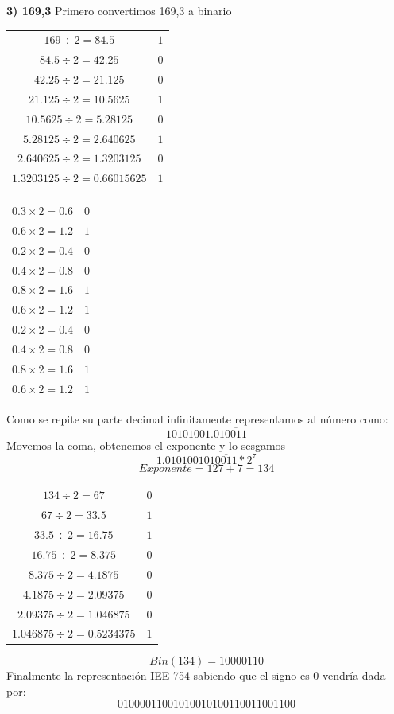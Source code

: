 \documentclass[12pt]{article}
\begin{document}
\large{\textbf{3) 169,3}}
\normalsize
Primero convertimos 169,3 a binario
\begin{center}
    \begin{tabular}{|c|c|}
        \hline
        $169 \div 2 = 84.5$ & $1$\\
        $84.5 \div 2 = 42.25$ & $0$\\
        $42.25 \div 2 = 21.125$ & $0$\\
        $21.125 \div 2 = 10.5625$ & $1$\\
        $10.5625 \div 2 = 5.28125$ & $0$\\
        $5.28125 \div 2 = 2.640625$ & $1$\\
        $2.640625 \div 2 = 1.3203125$ & $0$\\
        $1.3203125 \div 2 = 0.66015625$ & $1$\\
        \hline
      \end{tabular} 
\end{center}
\begin{center}
    \begin{tabular}{|c|c|}
        \hline
        $0.3 \times 2 = 0.6$ & $0$\\
        $0.6 \times 2 = 1.2$ & $1$\\
        $0.2 \times 2 = 0.4$ & $0$\\
        $0.4 \times 2 = 0.8$ & $0$\\
        $0.8 \times 2 = 1.6$ & $1$\\
        $0.6 \times 2 = 1.2$ & $1$\\
        $0.2 \times 2 = 0.4$ & $0$\\
        $0.4 \times 2 = 0.8$ & $0$\\
        $0.8 \times 2 = 1.6$ & $1$\\
        $0.6 \times 2 = 1.2$ & $1$\\
        \hline
      \end{tabular} 
\end{center}
Como se repite su parte decimal infinitamente representamos al número como:
$$ 10101001.01\overline{0011}$$
Movemos la coma, obtenemos el exponente y lo sesgamos
$$ 1.010100101\overline{0011}*2^7$$
$$Exponente= 127+7=134$$
\begin{center}
    \begin{tabular}{|c|c|}
        \hline
        $134 \div 2 = 67$ & $0$\\
        $67 \div 2 = 33.5$ & $1$\\
        $33.5 \div 2 = 16.75$ & $1$\\
        $16.75 \div 2 = 8.375$ & $0$\\
        $8.375 \div 2 = 4.1875$ & $0$\\
        $4.1875 \div 2 = 2.09375$ & $0$\\
        $2.09375 \div 2 = 1.046875$ & $0$\\
        $1.046875 \div 2 = 0.5234375$ & $1$\\
        \hline
      \end{tabular} 
\end{center}
$$Bin(134) = 10000110$$
Finalmente la representación IEE 754 sabiendo que el signo es 0 vendría dada por:
$$01000011001010010100110011001100$$
\end{document}
